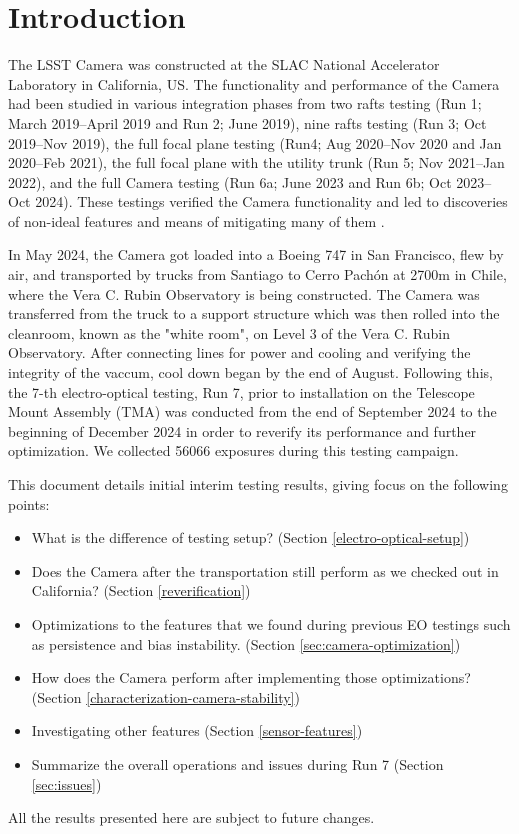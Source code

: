 \section{Introduction}
The LSST Camera was constructed at the SLAC National Accelerator Laboratory in California, US.
The functionality and performance of the Camera had been studied in various integration phases from two rafts testing (Run 1; March 2019--April 2019 and Run 2; June 2019), nine rafts testing (Run 3; Oct 2019--Nov 2019), the full focal plane testing (Run4; Aug 2020--Nov 2020 and Jan 2020--Feb 2021), the full focal plane with the utility trunk (Run 5; Nov 2021--Jan 2022), and the full Camera testing (Run 6a; June 2023 and Run 6b; Oct 2023--Oct 2024). These testings verified the Camera functionality and led to discoveries of non-ideal features and means of mitigating many of them \citep{2024SPIE13096E..1SR}.

In May 2024, the Camera got loaded into a Boeing 747 in San Francisco, flew by air, and transported by trucks from Santiago to Cerro Pachón at 2700m in Chile, where the Vera C. Rubin Observatory is being constructed. The Camera was transferred from the truck to a support structure which was then rolled into the cleanroom, known as the "white room", on Level 3 of the Vera C. Rubin Observatory. After connecting lines for power and cooling and verifying the integrity of the vaccum, cool down began by the end of August. Following this, the 7-th electro-optical testing, Run 7, prior to installation on the Telescope Mount Assembly (TMA) was conducted from the end of September 2024 to the beginning of December 2024 in order to reverify its performance and further optimization. We collected 56066 exposures during this testing campaign.

This document details initial interim testing results, giving focus on the following points:
\begin{itemize}
    \item What is the difference of testing setup? (Section \ref{electro-optical-setup})
    \item Does the Camera after the transportation still perform as we checked out in California? (Section \ref{reverification})
    \item Optimizations to the features that we found during previous EO testings such as persistence and bias instability. (Section \ref{sec:camera-optimization})
    \item How does the Camera perform after implementing those optimizations? (Section \ref{characterization-camera-stability})
    \item Investigating other features (Section \ref{sensor-features})
    \item Summarize the overall operations and issues during Run 7 (Section \ref{sec:issues})
\end{itemize}
All the results presented here are subject to future changes.

